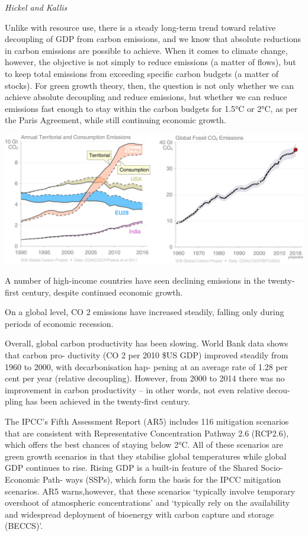 \documentclass[
]{book}
\begin{document}
\emph{Hickel and Kallis}

Unlike with resource use, there is a steady long-term trend toward relative decoupling of GDP from
carbon emissions, and we know that absolute reductions in carbon emissions are possible to achieve.
When it comes to climate change, however, the objective is not simply to reduce emissions (a matter
of flows), but to keep total emissions from exceeding specific carbon budgets (a matter of stocks). For
green growth theory, then, the question is not only whether we can achieve absolute decoupling and
reduce emissions, but whether we can reduce emissions fast enough to stay within the carbon
budgets for 1.5°C or 2°C, as per the Paris Agreement, while still continuing economic growth.

\includegraphics{fig/Hickel_Carbon_Decoupling.png}

A number of high-income countries have seen declining emissions in the twenty-first century,
despite continued economic growth.

On a global level, CO 2 emissions have increased steadily, falling only during periods of economic
recession.

Overall, global carbon productivity has been slowing. World Bank data shows that carbon pro-
ductivity (CO 2 per 2010 \$US GDP) improved steadily from 1960 to 2000, with decarbonisation hap-
pening at an average rate of 1.28 per cent per year (relative decoupling). However, from 2000 to
2014 there was no improvement in carbon productivity -- in other words, not even relative decou-
pling has been achieved in the twenty-first century.

The IPCC's Fifth Assessment Report (AR5) includes 116 mitigation scenarios that are consistent
with Representative Concentration Pathway 2.6 (RCP2.6), which offers the best chances of staying
below 2°C. All of these scenarios are green growth scenarios in that they stabilise global temperatures
while global GDP continues to rise. Rising GDP is a built-in feature of the Shared Socio-Economic Path-
ways (SSPs), which form the basis for the IPCC mitigation scenarios.
AR5 warns,however, that these scenarios `typically involve
temporary overshoot of atmospheric concentrations'
and `typically rely on the availability and widespread deployment of bioenergy with carbon capture
and storage (BECCS)'.
\end{document}
